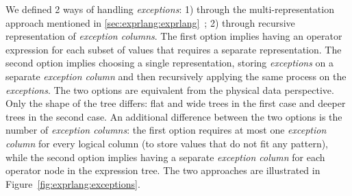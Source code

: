 We defined 2 ways of handling \textit{exceptions}: 1) through the multi-representation approach mentioned in \ref{sec:exprlang:exprlang}~; 2) through recursive representation of \textit{exception columns}. The first option implies having an operator expression for each subset of values that requires a separate representation. The second option implies choosing a single representation, storing \textit{exceptions} on a separate \textit{exception column} and then recursively applying the same process on the \textit{exceptions}. The two options are equivalent from the physical data perspective. Only the shape of the tree differs: flat and wide trees in the first case and deeper trees in the second case. An additional difference between the two options is the number of \textit{exception columns}: the first option requires at most one \textit{exception column} for every logical column (to store values that do not fit any pattern), while the second option implies having a separate \textit{exception column} for each operator node in the expression tree. The two approaches are illustrated in Figure~\ref{fig:exprlang:exceptions}.

